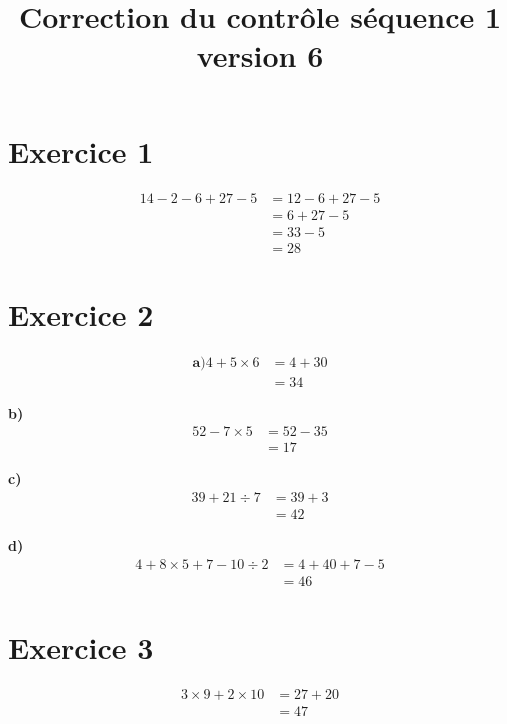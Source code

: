 \documentclass[12pt]{extarticle}
\title{\textbf{Correction du contrôle séquence 1 version 6}}
\author{}
\date{}
\begin{document}
\maketitle

\section*{Exercice 1}
\begin{align*}
14 - 2 - 6 + 27 - 5 &= 12 - 6 + 27 - 5 \\
                     &= 6 + 27 - 5 \\
                     &= 33 - 5 \\
                     &= 28
\end{align*}

\section*{Exercice 2}

\begin{align*}
\textbf{a)}
4 + 5 \times 6 &= 4 + 30 \\
               &= 34
\end{align*}

\textbf{b)}
\begin{align*}
52 - 7 \times 5 &= 52 - 35 \\
                &= 17
\end{align*}

\textbf{c)}
\begin{align*}
39 + 21 \div 7 &= 39 + 3 \\
               &= 42
\end{align*}

\textbf{d)}
\begin{align*}
4 + 8 \times 5 + 7 - 10 \div 2 &= 4 + 40 + 7 - 5 \\
                              &= 46
\end{align*}

\section*{Exercice 3}
\begin{align*}
3 \times 9 + 2 \times 10 &= 27 + 20 \\
                        &= 47
\end{align*}
\end{document}

